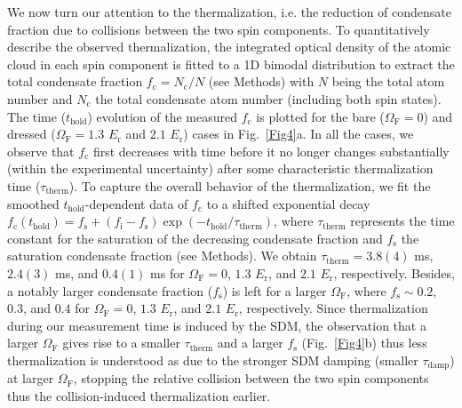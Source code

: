 \documentclass[showpacs,preprintnumbers,amsmath,amssymb, superscriptaddress, aps, reprint]{revtex4-1}
\def\E_r{E_{\text{r}}}
\def\OmegaF{\Omega_{\text{F}}}
\def\thold{t_{\text{hold}}}
\begin{document}
{We now turn our attention to the thermalization, 
{i.e. the reduction of condensate fraction due to collisions between the two spin components.} 
To quantitatively describe the observed thermalization, the integrated optical density of the atomic cloud in each spin component is fitted to a 1D bimodal distribution to extract the total condensate fraction ${f_{\text{c}}} = {N_{\text{c}}}/N$ ({see Methods}) with $N$ being the total atom number and $N_{\text{c}}$ the total condensate atom number (including both spin states). The time ($\thold$) evolution of the measured $f_{\text{c}}$ is plotted for the bare ($\OmegaF = 0$) and dressed ($\OmegaF = 1.3$ $\E_r$ and $2.1$ $\E_r$) cases in Fig.~\ref{Fig4}a. In all the cases, we observe that $f_{\text{c}}$  first decreases with time before it no longer changes substantially (within the experimental uncertainty) after some characteristic thermalization time ($\tau_{\text{therm}}$). To capture the overall behavior of the thermalization, we fit the smoothed $\thold$-dependent data of $f_{\text{c}}$ to a shifted exponential decay  ${f_{\text{c}}}({\thold}) = {f_{\text{s}}} + \left( {f_{\text{i}} - {f_{\text{s}}}} \right)\exp ( - {\thold}/{\tau_{\text{therm}}})$, where $\tau_{\text{therm}}$ represents the time constant for the saturation of the decreasing condensate fraction and ${f_{\text{s}}}$  the saturation condensate fraction ({see Methods}). We obtain $\tau_{\text{therm}} = 3.8(4)$ ms, $2.4(3)$ ms, and $0.4(1)$ ms for $\OmegaF = 0$, $1.3$ $\E_r$, and $2.1$ $\E_r$, respectively. Besides, a notably larger condensate fraction ($f_{\text{s}}$) is left for a larger $\OmegaF$, where $f_{\text{s}} \sim 0.2$, $0.3$, and $0.4$ for $\OmegaF = 0$, $1.3$ $\E_r$, and $2.1$ $\E_r$, respectively. 
{Since thermalization during our measurement time is induced by the SDM}, the observation that a larger $\OmegaF$ gives rise to a smaller $\tau_{\text{therm}}$ and a larger $f_{\text{s}}$ (Fig.~\ref{Fig4}b) thus less thermalization is understood as due to the stronger SDM damping (smaller $\tau_{\text{damp}}$) at larger $\OmegaF$, stopping the relative collision between the two spin components thus the collision-induced thermalization earlier.


}
\end{document}
